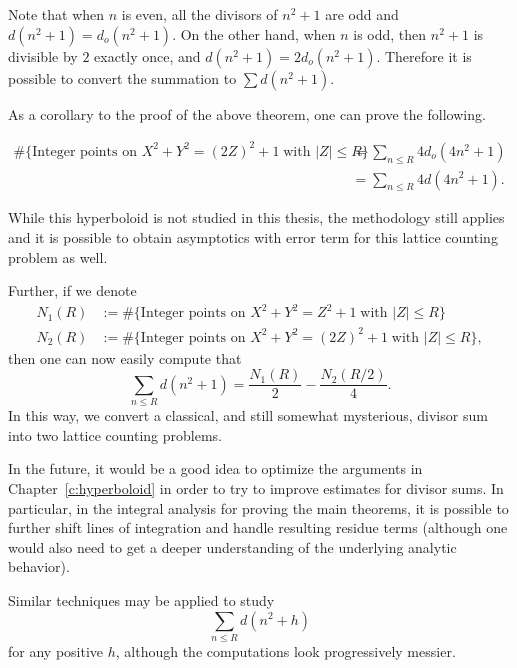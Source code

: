 Note that when $n$ is even, all the divisors of $n^2 + 1$ are odd and $d(n^2 + 1) =
d_o(n^2 + 1)$.
On the other hand, when $n$ is odd, then $n^2 + 1$ is divisible by $2$ exactly once, and
$d(n^2 + 1)=2d_o(n^2 + 1)$.
Therefore it is possible to convert the summation to $\sum d(n^2 + 1)$.



As a corollary to the proof of the above theorem, one can prove the following.
\begin{corollary}
  \begin{align}
    \#\{\text{Integer points on } X^2 + Y^2 = (2Z)^2 + 1 \; \text{with } \lvert Z \rvert
    \leq R \} &= \sum_{n \leq R} 4 d_o(4n^2 + 1) \\
    &= \sum_{n \leq R} 4 d(4n^2 + 1).
  \end{align}
\end{corollary}
While this hyperboloid is not studied in this thesis, the methodology still applies and
it is possible to obtain asymptotics with error term for this lattice counting problem as
well.


Further, if we denote
\begin{align}
  N_1(R) &:= \#\{\text{Integer points on } X^2 + Y^2 = Z^2 + 1 \; \text{with } \lvert Z
  \rvert \leq R \}
  \\
  N_2(R) &:= \#\{\text{Integer points on } X^2 + Y^2 = (2Z)^2 + 1 \; \text{with } \lvert Z
  \rvert \leq R \},
\end{align}
then one can now easily compute that
\begin{equation}
  \sum_{n \leq R} d(n^2 + 1) = \frac{N_1(R)}{2} - \frac{N_2(R/2)}{4}.
\end{equation}
In this way, we convert a classical, and still somewhat mysterious, divisor sum into two
lattice counting problems.


In the future, it would be a good idea to optimize the arguments in
Chapter~\ref{c:hyperboloid} in order to try to improve estimates for divisor sums.
In particular, in the integral analysis for proving the main theorems, it is possible to
further shift lines of integration and handle resulting residue terms (although one would
also need to get a deeper understanding of the underlying analytic behavior).



\begin{remark}
  Similar techniques may be applied to study
  \begin{equation}
    \sum_{n \leq R} d(n^2 + h)
  \end{equation}
  for any positive $h$, although the computations look progressively messier.
\end{remark}





